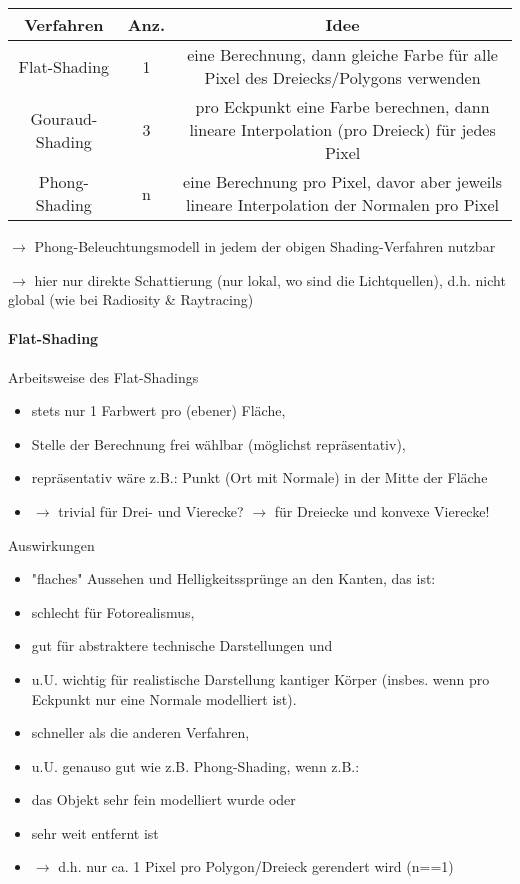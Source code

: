 \documentclass[10pt,landscape]{article}
\begin{document}
\begin{multicols}{3}
{  \begin{tabular}{c | c | c}
    Verfahren       & Anz. & Idee                                                                                        \\\hline
    Flat-Shading    & 1    & eine Berechnung, dann gleiche Farbe für alle Pixel des Dreiecks/Polygons verwenden          \\
    Gouraud-Shading & 3    & pro Eckpunkt eine Farbe berechnen, dann lineare Interpolation (pro Dreieck) für jedes Pixel \\
    Phong-Shading   & n    & eine Berechnung pro Pixel, davor aber jeweils lineare Interpolation der Normalen pro Pixel  \\
  \end{tabular}
  
  $\rightarrow$ Phong-Beleuchtungsmodell in jedem der obigen Shading-Verfahren nutzbar
  
  $\rightarrow$ hier nur direkte Schattierung (nur lokal, wo sind die Lichtquellen), d.h. nicht global (wie bei Radiosity \& Raytracing)
  
  \paragraph{Flat-Shading}
  Arbeitsweise des Flat-Shadings
  \begin{itemize}
    \item stets nur 1 Farbwert pro (ebener) Fläche,
    \item Stelle der Berechnung frei wählbar (möglichst repräsentativ),
    \item repräsentativ wäre z.B.: Punkt (Ort mit Normale) in der Mitte der Fläche
    \item $\rightarrow$ trivial für Drei- und Vierecke? $\rightarrow$ für Dreiecke und konvexe Vierecke!
  \end{itemize}
  
  Auswirkungen
  \begin{itemize}
    \item "flaches" Aussehen und Helligkeitssprünge an den Kanten, das ist:
    \item schlecht für Fotorealismus,
    \item gut für abstraktere technische Darstellungen und
    \item u.U. wichtig für realistische Darstellung kantiger Körper (insbes. wenn pro Eckpunkt nur eine Normale modelliert ist).
    \item schneller als die anderen Verfahren,
    \item u.U. genauso gut wie z.B. Phong-Shading, wenn z.B.:
    \item das Objekt sehr fein modelliert wurde oder
    \item sehr weit entfernt ist
    \item $\rightarrow$ d.h. nur ca. 1 Pixel pro Polygon/Dreieck gerendert wird (n==1)
  \end{itemize}
  
}
\end{multicols}
\end{document}
